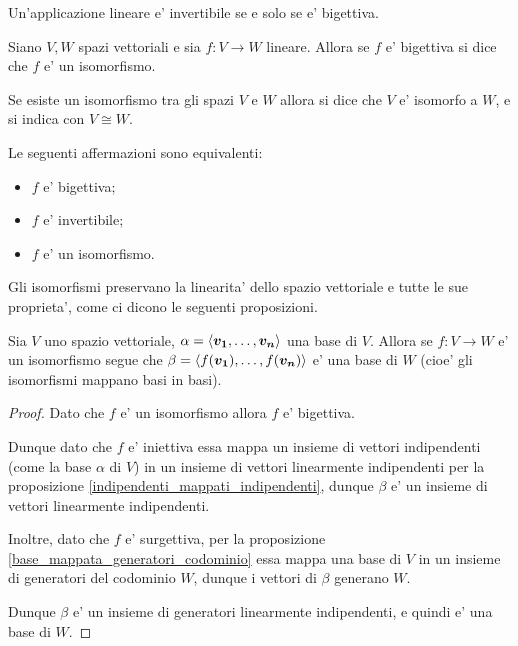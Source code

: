 \begin{remark}
    Un'applicazione lineare e' invertibile se e solo se e' bigettiva. 
\end{remark}

\begin{definition}
    Siano $V, W$ spazi vettoriali e sia $f : V \to W$ lineare. Allora se $f$ e' bigettiva si dice che $f$ e' un isomorfismo.
    
    Se esiste un isomorfismo tra gli spazi $V$ e $W$ allora si dice che $V$ e' isomorfo a $W$, e si indica con $V \cong W$.
\end{definition}

\begin{remark}
    Le seguenti affermazioni sono equivalenti:
    \begin{itemize}
        \item $f$ e' bigettiva;
        \item $f$ e' invertibile;
        \item $f$ e' un isomorfismo.
    \end{itemize}
\end{remark}

Gli isomorfismi preservano la linearita' dello spazio vettoriale e tutte le sue proprieta', come ci dicono le seguenti proposizioni.

\begin{proposition}
    Sia $V$ uno spazio vettoriale, $\alpha = \left\langle \bm{v_1}, \dots, \bm{v_n} \right\rangle$ una base di $V$. Allora se $f : V \to W$ e' un isomorfismo segue che $\beta = \left\langle f(\bm{v_1}), \dots, f(\bm{v_n}) \right\rangle$ e' una base di $W$ (cioe' gli isomorfismi mappano basi in basi).
\end{proposition}
\begin{proof}
    Dato che $f$ e' un isomorfismo allora $f$ e' bigettiva.

    Dunque dato che $f$ e' iniettiva essa mappa un insieme di vettori indipendenti (come la base $\alpha$ di $V$) in un insieme di vettori linearmente indipendenti per la proposizione \ref{indipendenti_mappati_indipendenti}, dunque $\beta$ e' un insieme di vettori linearmente indipendenti. 

    Inoltre, dato che $f$ e' surgettiva, per la proposizione \ref{base_mappata_generatori_codominio} essa mappa una base di $V$ in un insieme di generatori del codominio $W$, dunque i vettori di $\beta$ generano $W$.

    Dunque $\beta$ e' un insieme di generatori linearmente indipendenti, e quindi e' una base di $W$.
\end{proof}

